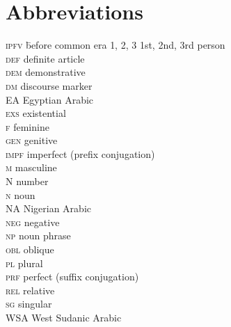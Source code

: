 \documentclass[output=paper]{langsci/langscibook}
\begin{document}
\section*{Abbreviations}
\setlength{\columnsep}{30pt}
\begin{multicols}{2}
\begin{tabbing}
\textsc{ipfv} \hspace{1em} \= before common era\kill
\textsc{1, 2, 3} \> 1st, 2nd, 3rd person \\
\textsc{def} \> definite article \\
\textsc{dem} \> demonstrative \\
\textsc{dm} \> discourse marker \\
EA \> Egyptian Arabic \\
\textsc{exs} \> existential  \\
\textsc{f} \> feminine \\
\textsc{gen} \> genitive \\
\textsc{impf} \> imperfect (prefix conjugation) \\
\textsc{m} \> masculine \\
N \> number \\
\textsc{n} \> noun \\
NA \> {Nigerian Arabic} \\
\textsc{neg} \> negative \\
\textsc{np} \> noun phrase \\
\textsc{obl} \> oblique \\
\textsc{pl} \> plural \\
\textsc{prf} \> perfect (suffix conjugation) \\
\textsc{rel} \> relative \\
\textsc{sg} \> singular \\
WSA \> West Sudanic Arabic
\end{tabbing}
\end{multicols} 
 
 
\sloppy
\printbibliography[heading=subbibliography,notkeyword=this] 
\end{document}
